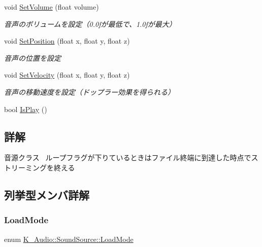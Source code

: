 \begin{DoxyCompactItemize}
void \mbox{\hyperlink{class_k___audio_1_1_sound_source_a7cae6d62c0635bc94bf8a2afccc32b9a}{Set\+Volume}} (float volume)
\begin{DoxyCompactList}\small\item\em 音声のボリュームを設定（0.0fが最低で、1.0fが最大） \end{DoxyCompactList}\item 
void \mbox{\hyperlink{class_k___audio_1_1_sound_source_a318fd679d40894f4568e6e9a50ff023f}{Set\+Position}} (float x, float y, float z)
\begin{DoxyCompactList}\small\item\em 音声の位置を設定 \end{DoxyCompactList}\item 
void \mbox{\hyperlink{class_k___audio_1_1_sound_source_a04c7824dd29a005186d66d1e1bd7cf4c}{Set\+Velocity}} (float x, float y, float z)
\begin{DoxyCompactList}\small\item\em 音声の移動速度を設定（ドップラー効果を得られる） \end{DoxyCompactList}\item 
bool \mbox{\hyperlink{class_k___audio_1_1_sound_source_a81fee1252efe87d2003433d30312cb3c}{Is\+Play}} ()
\end{DoxyCompactItemize}


\subsection{詳解}
音源クラス~\newline
ループフラグが下りているときはファイル終端に到達した時点でストリーミングを終える 

\subsection{列挙型メンバ詳解}
\mbox{\label{class_k___audio_1_1_sound_source_ad0e58f4cea821bc4087ed13830b06f69}} 
\subsubsection{\texorpdfstring{Load\+Mode}{LoadMode}}
{\footnotesize\ttfamily enum \mbox{\hyperlink{class_k___audio_1_1_sound_source_ad0e58f4cea821bc4087ed13830b06f69}{K\+\_\+\+Audio\+::\+Sound\+Source\+::\+Load\+Mode}}}




